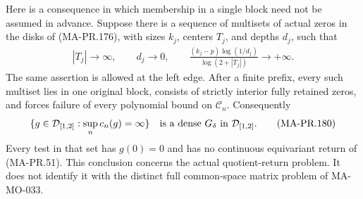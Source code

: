 Here is a consequence in which membership in a
single block need not be assumed in advance.
Suppose there is a sequence of multisets of actual
zeros in the disks of (MA-PR.176), with sizes \(k_j\),
centers \(T_j\), and depths \(d_j\), such that
\[
 \begin{gathered}
 |T_j|\longrightarrow\infty,\qquad
 d_j\longrightarrow0,\qquad
 \frac{(k_j-p)\log(1/d_j)}
                     {\log(2+|T_j|)}
                         \longrightarrow+\infty .
 \end{gathered}
 \tag{MA-PR.179}
\]
The same assertion is allowed at the left edge.
After a finite prefix, every such multiset lies
in one original block, consists of strictly
interior fully retained zeros, and forces failure
of every polynomial bound on \(\mathcal C_n\).
Consequently
\[
 \{g\in\mathcal D_{[1,2]}:
                    \sup_n c_n(g)=\infty\}
       \quad\hbox{is a dense }G_\delta
                       \hbox{ in }\mathcal D_{[1,2]} .
 \tag{MA-PR.180}
\]
Every test in that set has \(g(0)=0\) and has no
continuous equivariant return of (MA-PR.51).
This conclusion concerns the actual quotient-return
problem.  It does not identify it with the distinct
full common-space matrix problem of MA-MO-033.

